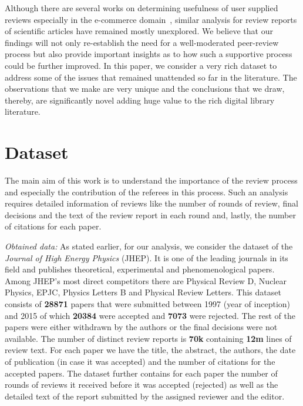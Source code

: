 Although there are several works on determining usefulness of user supplied reviews especially in the e-commerce domain~\cite{ghose2011estimating, kim2006automatically}, similar analysis for review reports of scientific articles have remained mostly unexplored. We believe that our findings will not only re-establish the need for a well-moderated peer-review process but also provide important insights as to how such a supportive process could be further improved. In this paper, we consider a very rich dataset to address some of the issues that remained unattended so far in the literature. The observations that we make are very unique and the conclusions that we draw, thereby, are significantly novel adding huge value to the rich digital library literature.

\fi
%

\section{Dataset}
\label{dataset}



The main aim of this work is to understand the importance of the review process and especially the contribution of the referees in this process. Such an analysis requires detailed information of reviews like the number of rounds of review, final decisions and the text of the review report in each round and, lastly, the number of citations for each paper. 

{\em Obtained data:} As stated earlier, for our analysis, we consider the dataset of the {\em Journal of High Energy Physics} (JHEP). It is one of the leading journals in its field and publishes theoretical, experimental and phenomenological papers. Among JHEP's most direct competitors there are Physical Review D, Nuclear Physics, EPJC, Physics Letters B and Physical Review Letters.
This dataset consists of {\bf 28871} papers that were submitted between 1997 (year of inception) and 2015 of which {\bf 20384} were accepted and {\bf 7073} were rejected. The rest of the papers were either withdrawn by the authors or the final decisions were not available. The number of distinct review reports is {\bf 70k} containing {\bf 12m} lines of review text. For each paper we have the title, the abstract, the authors, the date of publication (in case it was accepted) and the number of citations for the accepted papers. The dataset further contains for each paper the number of rounds of reviews it received before it was accepted (rejected) as well as the detailed text of the report submitted by the assigned reviewer and the editor.


